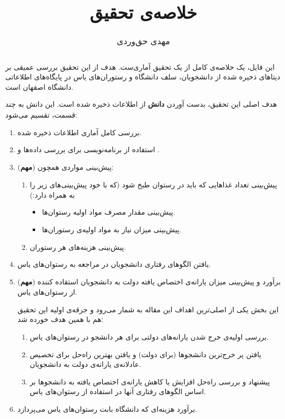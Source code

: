 \documentclass{article}
\title{خلاصه‌ی تحقیق}
\author{مهدی حق‌وردی}
\begin{document}
\newcommand{\important}{{\tiny (\textbf{مهم}) }}
\maketitle
\newpage

\tableofcontents
\newpage

	\begin{abstract}
	این فایل،‌ یک خلاصه‌ی کامل از یک تحقیق آماری‌ست. هدف از این تحقیق بررسی عمیقی بر دیتا‌های ذخیره‌ شده‌ از دانشجویان، سلف دانشگاه و رستوران‌های یاس در پایگاه‌‌های اطلاعاتی دانشگاه اصفهان است.
	
	هدف اصلی این تحقیق،‌ بدست آوردن \textbf{دانش} از اطلاعات ذخیره‌ شده است. این دانش به چند قسمت، تقسیم می‌شود:
	\begin{enumerate}
		\item 
		بررسی کامل آماری اطلاعات ذخیره شده.
		\item
		 استفاده از برنامه‌نویسی برای بررسی داده‌ها و .
		\item \important
		 پیش‌بینی مواردی همچون:
		\begin{enumerate}
			\item
			پیش‌بینی تعداد‌ غذا‌هایی که باید در رستوان طبخ شود (که با خود پیش‌بینی‌های زیر را به همراه دارد:)
			\begin{itemize}
			    \item 
			    پیش‌بینی مقدار مصرف مواد اولیه‌ رستوان‌ها.
			    \item 
			    پیش‌بینی میزان نیاز به مواد اولیه‌ی رستوران‌‌ها.
			\end{itemize}
		    \item 
		    پیش‌بینی هزینه‌های هر رستوران.
		\end{enumerate}
	    \item 
	    یافتن الگو‌های رفتاری دانشجویان در مراجعه به رستوان‌‌های یاس.
		\item \important
			برآورد و پیش‌بینی میزان یارانه‌ی اختصاص یافته‌ دولت به دانشجویان استفاده کننده از رستوان‌های یاس.
			
			این بخش یکی از اصلی‌ترین اهداف این مقاله به شمار می‌رود و جرقه‌ی اولیه این تحقیق هم با همین هدف خورده‌ شد:
		\begin{enumerate}
			\item 
			بررسی اولیه‌ی خرج‌ شدن یارانه‌های دولتی برای هر دانشجو در رستوان‌های یاس.
			\item 
			یافتن پر خرج‌ترین دانشجو‌ها (برای دولت) و یافتن بهترین راه‌حل برای تخصیص  عادلانه‌ی یارانه‌ی دولت به دانشجویان.
			\item 
			پیشنهاد و بررسی راه‌حل افزایش یا کاهش یارانه‌ی اختصاص یافته به دانشجو‌ها بر اساس الگو‌های رفتاری آنها در استفاده از رستوان‌های یاس.
		\end{enumerate}
	    \item 
	    برآورد هزینه‌ای که دانشگاه بابت رستوان‌های یاس می‌پردازد.
	\end{enumerate}
	\end{abstract}
	\newpage
\end{document}
